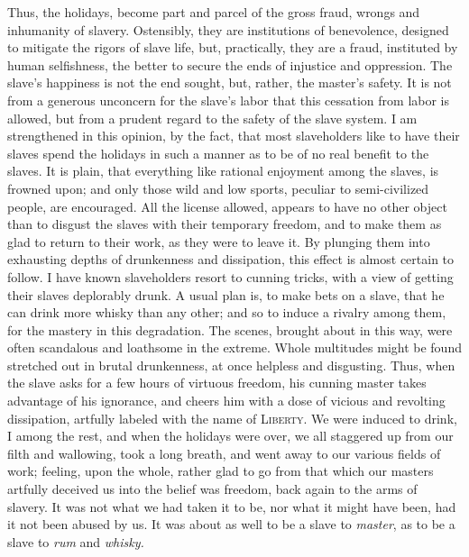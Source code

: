 Thus, the holidays, become part and parcel of the gross fraud, wrongs
and inhumanity of slavery. Ostensibly, they are institutions of
benevolence, designed to mitigate the rigors of slave life, but,
practically, they are a fraud, instituted by human selfishness, the
better to secure the ends of injustice and oppression. The slave's
happiness is not the end sought, but, rather, the master's safety. It is
not from a generous unconcern for the slave's labor that this cessation
from labor is allowed, but from a prudent regard to the {}safety of the
slave system. I am strengthened in this opinion, by the fact, that most
slaveholders like to have their slaves spend the holidays in such a
manner as to be of no real benefit to the slaves. It is plain, that
everything like rational enjoyment among the slaves, is frowned upon;
and only those wild and low sports, peculiar to semi-civilized people,
are encouraged. All the license allowed, appears to have no other object
than to disgust the slaves with their temporary freedom, and to make
them as glad to return to their work, as they were to leave it. By
plunging them into exhausting depths of drunkenness and dissipation,
this effect is almost certain to follow. I have known slaveholders
resort to cunning tricks, with a view of getting their slaves deplorably
drunk. A usual plan is, to make bets on a slave, that he can drink more
whisky than any other; and so to induce a rivalry among them, for the
mastery in this degradation. The scenes, brought about in this way, were
often scandalous and loathsome in the extreme. Whole multitudes might be
found stretched out in brutal drunkenness, at once helpless and
disgusting. Thus, when the slave asks for a few hours of virtuous
freedom, his cunning master takes advantage of his ignorance, and cheers
him with a dose of vicious and revolting dissipation, artfully labeled
with the name of \textsc{Liberty}. We were induced to drink, I among the
rest, and when the holidays were over, we all staggered up from our
filth and wallowing, took a long breath, and went away to our various
fields of work; feeling, upon the whole, rather glad to go from that
which our masters artfully deceived us into the belief was {}freedom,
back again to the arms of slavery. It was not what we had taken it to
be, nor what it might have been, had it not been abused by us. It was
about as well to be a slave to \emph{master}, as to be a slave to
\emph{rum} and \emph{whisky.}


